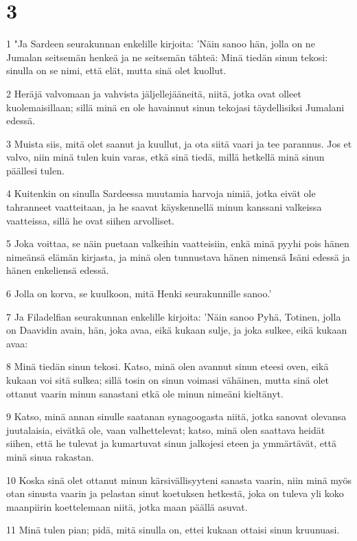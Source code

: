 \chapter{3}

\par 1 "Ja Sardeen seurakunnan enkelille kirjoita: 'Näin sanoo hän, jolla on ne Jumalan seitsemän henkeä ja ne seitsemän tähteä: Minä tiedän sinun tekosi: sinulla on se nimi, että elät, mutta sinä olet kuollut.
\par 2 Heräjä valvomaan ja vahvista jäljellejääneitä, niitä, jotka ovat olleet kuolemaisillaan; sillä minä en ole havainnut sinun tekojasi täydellisiksi Jumalani edessä.
\par 3 Muista siis, mitä olet saanut ja kuullut, ja ota siitä vaari ja tee parannus. Jos et valvo, niin minä tulen kuin varas, etkä sinä tiedä, millä hetkellä minä sinun päällesi tulen.
\par 4 Kuitenkin on sinulla Sardeessa muutamia harvoja nimiä, jotka eivät ole tahranneet vaatteitaan, ja he saavat käyskennellä minun kanssani valkeissa vaatteissa, sillä he ovat siihen arvolliset.
\par 5 Joka voittaa, se näin puetaan valkeihin vaatteisiin, enkä minä pyyhi pois hänen nimeänsä elämän kirjasta, ja minä olen tunnustava hänen nimensä Isäni edessä ja hänen enkeliensä edessä.
\par 6 Jolla on korva, se kuulkoon, mitä Henki seurakunnille sanoo.'
\par 7 Ja Filadelfian seurakunnan enkelille kirjoita: 'Näin sanoo Pyhä, Totinen, jolla on Daavidin avain, hän, joka avaa, eikä kukaan sulje, ja joka sulkee, eikä kukaan avaa:
\par 8 Minä tiedän sinun tekosi. Katso, minä olen avannut sinun eteesi oven, eikä kukaan voi sitä sulkea; sillä tosin on sinun voimasi vähäinen, mutta sinä olet ottanut vaarin minun sanastani etkä ole minun nimeäni kieltänyt.
\par 9 Katso, minä annan sinulle saatanan synagoogasta niitä, jotka sanovat olevansa juutalaisia, eivätkä ole, vaan valhettelevat; katso, minä olen saattava heidät siihen, että he tulevat ja kumartuvat sinun jalkojesi eteen ja ymmärtävät, että minä sinua rakastan.
\par 10 Koska sinä olet ottanut minun kärsivällisyyteni sanasta vaarin, niin minä myös otan sinusta vaarin ja pelastan sinut koetuksen hetkestä, joka on tuleva yli koko maanpiirin koettelemaan niitä, jotka maan päällä asuvat.
\par 11 Minä tulen pian; pidä, mitä sinulla on, ettei kukaan ottaisi sinun kruunuasi.
